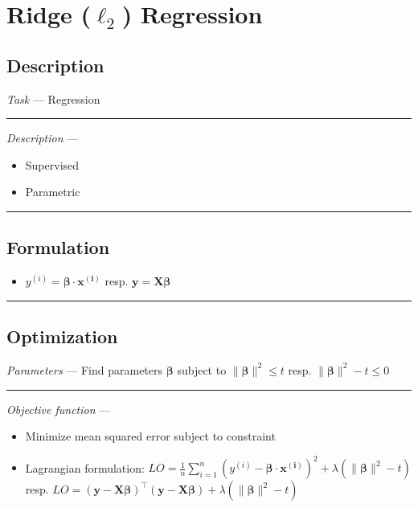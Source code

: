 \section{Ridge ($\ell_2$) Regression}
\subsection*{Description}
\emph{Task} --- Regression

{\color{lightgray}\hrule height 0.001mm}

\emph{Description} --- 
\begin{itemize}
    \item Supervised 
    \item Parametric
\end{itemize}

{\color{black}\hrule height 0.001mm}

\subsection*{Formulation}
\begin{itemize}
    \item $y^{(i)} = \boldsymbol{\beta} \cdot \boldsymbol{x^{(i)}}$ resp. $\boldsymbol{y} = \boldsymbol{X}\boldsymbol{\beta}$
\end{itemize}

{\color{black}\hrule height 0.001mm}

\subsection*{Optimization}
\emph{Parameters} --- Find parameters $\boldsymbol{\beta}$ subject to $\|\boldsymbol{\beta}\|^2 \leq t$ resp. $\|\boldsymbol{\beta}\|^2 - t \leq 0$

{\color{lightgray}\hrule height 0.001mm}

\emph{Objective function} --- 
\begin{itemize}
    \item Minimize mean squared error subject to constraint
    \item Lagrangian formulation: $LO = \frac{1}{n} \sum_{i=1}^n ( y^{(i)} - \boldsymbol{\beta} \cdot \boldsymbol{x^{(i)}} )^2 + \lambda ( \|\boldsymbol{\beta}\|^2 - t )$ resp. $LO = ( \boldsymbol{y} - \boldsymbol{X}\boldsymbol{\beta})^\intercal( \boldsymbol{y} - \boldsymbol{X}\boldsymbol{\beta} ) + \lambda ( \|\boldsymbol{\beta}\|^2 - t )$
\end{itemize}

